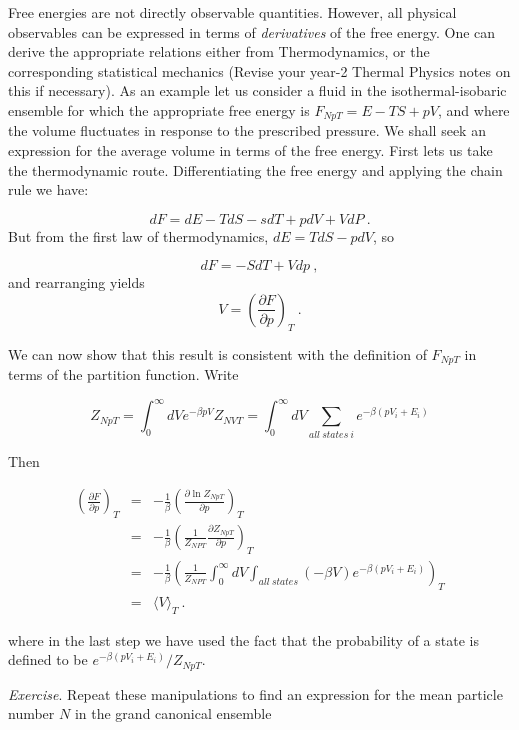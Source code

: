 \documentclass[
  letterpaper,
  enabledeprecatedfontcommands]{report}
\begin{document}

Free energies are not directly observable quantities. However, all
physical observables can be expressed in terms of \emph{derivatives} of
the free energy. One can derive the appropriate relations either from
Thermodynamics, or the corresponding statistical mechanics (Revise your
year-2 Thermal Physics notes on this if necessary). As an example let us
consider a fluid in the isothermal-isobaric ensemble for which the
appropriate free energy is \(F_{NpT}=E-TS+pV\), and where the volume
fluctuates in response to the prescribed pressure. We shall seek an
expression for the average volume in terms of the free energy. First
lets us take the thermodynamic route. Differentiating the free energy
and applying the chain rule we have:

\[
dF=dE-TdS-sdT+pdV+VdP\:.
\] But from the first law of thermodynamics, \(dE=TdS-pdV\), so

\[
dF=-SdT+Vdp\:,
\] and rearranging yields \[
V=\left(\frac{\partial F}{\partial p}\right)_T\:.
\]

We can now show that this result is consistent with the definition of
\(F_{NpT}\) in terms of the partition function. Write

\[
Z_{NpT}=\int_0^\infty dV  e^{-\beta p V}Z_{NVT}=\int_0^\infty dV\sum_{all~states~i}e^{-\beta (p V_i+E_i)}
\]

Then

\[
\begin{eqnarray}
\left(\frac{\partial F}{\partial p}\right)_T&=&-\frac{1}{\beta}\left(\frac{\partial \ln Z_{NpT}}{\partial p}\right)_T\nonumber \\
\:&=&-\frac{1}{\beta}\left(\frac{1}{Z_{NPT}}\frac{\partial Z_{NpT}}{\partial p}\right)_T\nonumber\\
\:&=&-\frac{1}{\beta}\left(\frac{1}{Z_{NPT}} \int_0^\infty dV\int_{all~states}(-\beta V)e^{-\beta (p V_i+E_i)}  \right)_T\nonumber\\
\:&=&\langle V\rangle_T\nonumber\:.
\end{eqnarray}
\]

where in the last step we have used the fact that the probability of a
state is defined to be \(e^{-\beta (p V_i+E_i)}/Z_{NpT}\).

\emph{Exercise}. Repeat these manipulations to find an expression for
the mean particle number \(N\) in the grand canonical ensemble
\end{document}

